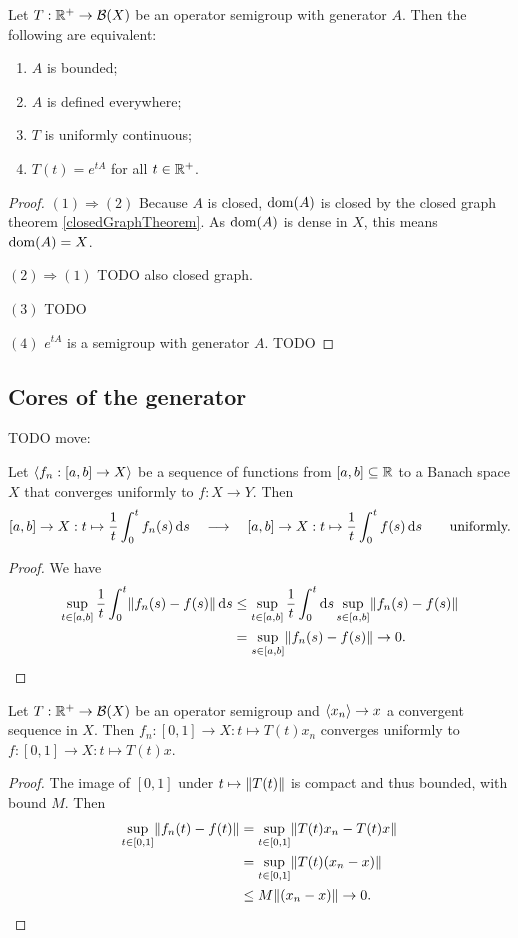 \begin{proposition} \label{boundedGenerator}
Let $T: \mathbb{R}^+\to \operatorname{\mathcal{B}}(X)$ be an operator semigroup with generator $A$. Then the following are equivalent:
\begin{enumerate}
\item $A$ is bounded;
\item $A$ is defined everywhere;
\item $T$ is uniformly continuous;
\item $T(t) = e^{tA}$ for all $t\in\mathbb{R} ^+$.
\end{enumerate}
\end{proposition}
\begin{proof}
$(1) \Rightarrow (2)$ Because $A$ is closed, $\operatorname{dom}(A)$ is closed by the closed graph theorem \ref{closedGraphTheorem}. As $\operatorname{dom}(A)$ is dense in $X$, this means $\operatorname{dom}(A) = X$.

$(2) \Rightarrow (1)$ TODO also closed graph.

$(3)$ TODO

$(4)$ $e^{tA}$ is a semigroup with generator $A$. TODO
\end{proof}

\subsection{Cores of the generator}
TODO move:
\begin{lemma} \label{uniformContinuityAverage}
Let $\left\langle f_n: [a,b]\to X \right\rangle$ be a sequence of functions from $[a,b]\subseteq \mathbb{R}$ to a Banach space $X$ that converges uniformly to $f: X\to Y$. Then
\[ [a,b]\to X: t\mapsto \frac{1}{t}\int_{0}^tf_n(s)\operatorname{d \!}{s} \quad\longrightarrow\quad [a,b]\to X: t\mapsto \frac{1}{t}\int_{0}^tf(s)\operatorname{d \!}{s} \qquad \text{uniformly.} \]
\end{lemma}
\begin{proof}
We have
\begin{align*}
\sup_{t\in[a,b]}\frac{1}{t}\int_0^t \lVert f_n(s) - f(s)\rVert\operatorname{d \!}{s} &\leq \sup_{t\in[a,b]}\frac{1}{t}\int_0^t \operatorname{d \!}{s}\sup_{s\in [a,b]} \lVert f_n(s) - f(s)\rVert \\
&= \sup_{s\in [a,b]} \lVert f_n(s) - f(s)\rVert \to 0.
\end{align*}
\end{proof}

\begin{lemma} \label{uniformContinuityOrbitMapsConvergentSequence}
Let $T: \mathbb{R}^+\to \operatorname{\mathcal{B}}(X)$ be an operator semigroup and $\left\langle x_n \right\rangle \to x$ a convergent sequence in $X$. Then $f_n: [0,1]\to X: t\mapsto T(t)x_n$ converges uniformly to $f: [0,1]\to X: t\mapsto T(t)x$.
\end{lemma}
\begin{proof}
The image of $[0,1]$ under $t\mapsto \lVert T(t)\rVert$ is compact and thus bounded, with bound $M$. Then
\begin{align*}
\sup_{t\in [0,1]}\lVert f_n(t) - f(t)\rVert &= \sup_{t\in [0,1]}\lVert T(t)x_n - T(t)x\rVert \\
&= \sup_{t\in [0,1]}\lVert T(t)(x_n - x)\rVert \\
&\leq M\lVert(x_n - x)\rVert \to 0.
\end{align*}
\end{proof}

